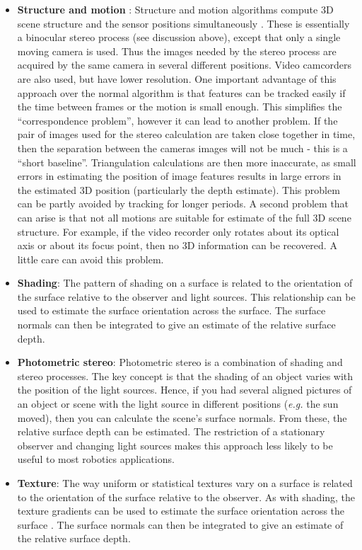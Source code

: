 \documentclass[twocolumn,oneside]{book}
\begin{document}
\begin{itemize}
\item {\bf Structure and motion }:
Structure and motion algorithms compute 3D scene structure and the sensor
positions simultaneously \cite{pollefeys}. These is essentially a binocular stereo 
process (see discussion above), except that only a single moving camera is
used. Thus the images needed by the stereo process are acquired by the
same camera in several different positions. 
Video camcorders are also used, but have lower resolution.
One important advantage of this approach over the normal algorithm is
that features can be tracked easily if the time between frames or the 
motion is small enough.
This simplifies the ``correspondence problem'', however it can lead
to another problem. If the pair of images used for the stereo calculation
are taken close together in time, then the separation between the cameras
images will not be much - this is a ``short baseline''.
Triangulation calculations are then more inaccurate, as small errors
in estimating the position of image features results in large errors in the
estimated 3D position (particularly the depth estimate). 
This problem can be partly avoided by tracking for longer periods.
A second problem that can arise is that not all motions are suitable
for estimate of the full 3D scene structure. For example, if the 
video recorder only rotates about its optical axis or about its
focus point, then no 3D information can be recovered.
A little care can avoid this problem.

\item {\bf Shading}:
The pattern of shading on a surface is related to the orientation of the
surface relative to the observer and light sources.
This relationship can be used to estimate the surface orientation
across the surface. The surface normals can then be integrated to
give an estimate of the relative surface depth.

\item {\bf Photometric stereo}:
Photometric stereo \cite{Hertzmann} is a combination of shading and stereo processes.
The key concept is that the shading of an object varies with the
position of the light sources. 
Hence, if you had several aligned pictures of an object or scene with the
light source in different positions ({\it e.g.} the sun moved), then
you can calculate the scene's surface normals.
From these, the relative surface depth can be estimated.
The restriction of a stationary observer and changing light sources
makes this approach less likely to be useful to most robotics applications.

\item {\bf Texture}:
The way uniform or statistical textures vary on a surface is related
to the orientation of the surface relative to the observer.
As with shading, the texture gradients can be used to estimate 
the surface orientation
across the surface \cite{Lobay}.
The surface normals can then be integrated to
give an estimate of the relative surface depth.

\end{itemize}
\end{document}
